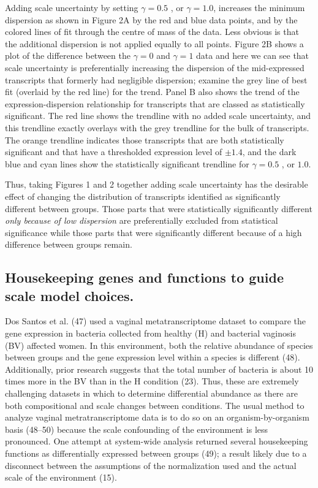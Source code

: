 \documentclass[
]{article}
\begin{document}
Adding scale uncertainty by setting \(\gamma=0.5\) , or
\(\gamma = 1.0\), increases the minimum dispersion as shown in Figure 2A
by the red and blue data points, and by the colored lines of fit through
the centre of mass of the data. Less obvious is that the additional
dispersion is not applied equally to all points. Figure 2B shows a plot
of the difference between the \(\gamma= 0\) and \(\gamma= 1\) data and
here we can see that scale uncertainty is preferentially increasing the
dispersion of the mid-expressed transcripts that formerly had negligible
dispersion; examine the grey line of best fit (overlaid by the red line)
for the trend. Panel B also shows the trend of the expression-dispersion
relationship for transcripts that are classed as statistically
significant. The red line shows the trendline with no added scale
uncertainty, and this trendline exactly overlays with the grey trendline
for the bulk of transcripts. The orange trendline indicates those
transcripts that are both statistically significant and that have a
thresholded expression level of \(\pm 1.4\), and the dark blue and cyan
lines show the statistically significant trendline for \(\gamma=0.5\) ,
or \(1.0\).

Thus, taking Figures 1 and 2 together adding scale uncertainty has the
desirable effect of changing the distribution of transcripts identified
as significantly different between groups. Those parts that were
statistically significantly different \emph{only because of low
dispersion} are preferentially excluded from statistical significance
while those parts that were significantly different because of a high
difference between groups remain.

\subsection{Housekeeping genes and functions to guide scale model
choices.}\label{housekeeping-genes-and-functions-to-guide-scale-model-choices.}

Dos Santos et al. (47) used a vaginal metatranscriptome dataset to
compare the gene expression in bacteria collected from healthy (H) and
bacterial vaginosis (BV) affected women. In this environment, both the
relative abundance of species between groups and the gene expression
level within a species is different (48). Additionally, prior research
suggests that the total number of bacteria is about 10 times more in the
BV than in the H condition (23). Thus, these are extremely challenging
datasets in which to determine differential abundance as there are both
compositional and scale changes between conditions. The usual method to
analyze vaginal metratranscriptome data is to do so on an
organism-by-organism basis (48--50) because the scale confounding of the
environment is less pronounced. One attempt at system-wide analysis
returned several housekeeping functions as differentially expressed
between groups (49); a result likely due to a disconnect between the
assumptions of the normalization used and the actual scale of the
environment (15).
\end{document}
